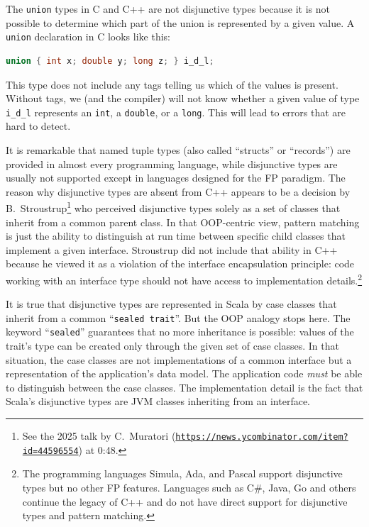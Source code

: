 The \lstinline!union! types in C and C++ are not disjunctive types
because it is not possible to determine which part of the union is
represented by a given value. A \lstinline!union! declaration in
C looks like this:
\begin{lstlisting}[language=C]
union { int x; double y; long z; } i_d_l;
\end{lstlisting}
This type does not include any tags telling us which of the values
is present. Without tags, we (and the compiler) will not know whether
a given value of type \lstinline!i_d_l! represents an \lstinline!int!,
a \lstinline!double!, or a \lstinline!long!. This will lead to errors
that are hard to detect.

It is remarkable that named tuple types (also called \textsf{``}structs\textsf{''}
or \textsf{``}records\textsf{''}) are provided in almost every programming language,
while disjunctive types are usually not supported except in languages
designed for the FP paradigm. The reason why disjunctive types are
absent from C++ appears to be a decision by B.~Stroustrup\footnote{See the 2025 talk by C.~Muratori (\texttt{\href{https://news.ycombinator.com/item?id=44596554}{https://news.ycombinator.com/item?id=44596554}})
at 0:48.} who perceived disjunctive types solely as a set of classes that inherit
from a common parent class. In that OOP-centric view, pattern matching
is just the ability to distinguish at run time between specific child
classes that implement a given interface. Stroustrup did not include
that ability in C++ because he viewed it as a violation of the interface
encapsulation principle: code working with an interface type should
not have access to implementation details.\footnote{The programming languages Simula, Ada, and Pascal support disjunctive
types but no other FP features. Languages such as C\#, Java, Go and
others continue the legacy of C++ and do not have direct support for
disjunctive types and pattern matching.} 

It is true that disjunctive types are represented in Scala by case
classes that inherit from a common \textsf{``}\lstinline!sealed trait!\textsf{''}.
But the OOP analogy stops here. The keyword \textsf{``}\lstinline!sealed!\textsf{''}
guarantees that no more inheritance is possible: values of the trait\textsf{'}s
type can be created only through the given set of case classes. In
that situation, the case classes are not implementations of a common
interface but a representation of the application\textsf{'}s data model. The
application code \emph{must} be able to distinguish between the case
classes. The implementation detail is the fact that Scala\textsf{'}s disjunctive
types are JVM classes inheriting from an interface.

